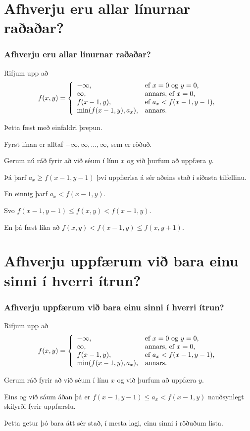 \section{Afhverju eru allar línurnar raðaðar?}
{
    \frametitle{Afhverju eru allar línurnar raðaðar?}
    {
        \item<1-> Rifjum upp að
        \[
            f(x, y) = \left \{
            \env{array}
            { {l l}
                -\infty, & \text{ef $x = 0$ og $y = 0$,} \\
                \infty, & \text{annars, ef $x = 0$,} \\
                f(x - 1, y), & \text{ef $a_x < f(x - 1, y - 1)$,} \\
                \min(f(x - 1, y), a_x), & \text{annars.}
            }
            \right .
        \]
        \item<2-> Þetta fæst með einfaldri þrepun.
        \item<3-> Fyrst línan er alltaf $-\infty, \infty, \dots, \infty$, sem er röðuð.
        \item<4-> Gerum nú ráð fyrir að við séum í línu $x$ og við þurfum að uppfæra $y$.
        \item<5-> Þá þarf $a_x \geq f(x - 1, y - 1)$ því uppfærlsa á sér aðeins stað í síðasta tilfellinu.
        \item<6-> En einnig þarf $a_x < f(x - 1, y)$.
        \item<7-> Svo $f(x - 1, y - 1) \leq f(x, y) < f(x - 1, y)$.
        \item<8-> En þá fæst líka að $f(x, y) < f(x - 1,y) \leq f(x, y + 1)$.
    }
}

\section{Afhverju uppfærum við bara einu sinni í hverri ítrun?}
{
    \frametitle{Afhverju uppfærum við bara einu sinni í hverri ítrun?}
    {
        \item<1-> Rifjum upp að
        \[
            f(x, y) = \left \{
            \env{array}
            { {l l}
                -\infty, & \text{ef $x = 0$ og $y = 0$,} \\
                \infty, & \text{annars, ef $x = 0$,} \\
                f(x - 1, y), & \text{ef $a_x < f(x - 1, y - 1)$,} \\
                \min(f(x - 1, y), a_x), & \text{annars.}
            }
            \right .
        \]
        \item<2-> Gerum ráð fyrir að við séum í línu $x$ og við þurfum að uppfæra $y$.
        \item<3-> Eins og við sáum áðan þá er $f(x - 1, y - 1) \leq a_x < f(x - 1, y)$ nauðsynlegt skilyrði fyrir uppfærslu.
        \item<4-> Þetta getur þó bara átt sér stað, í mesta lagi, einu sinni í röðuðum lista.
    }
}

